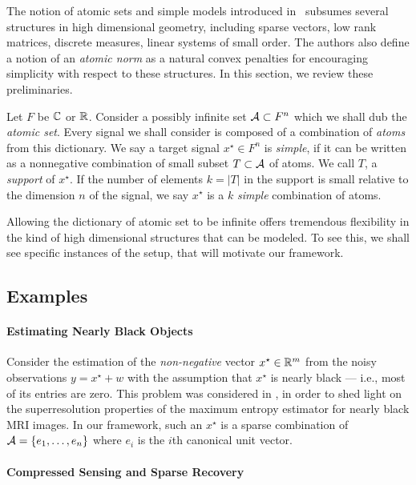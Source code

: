 The notion of atomic sets and simple models introduced in~\cite{crpw} subsumes
several structures in high dimensional geometry, including sparse
vectors, low rank matrices, discrete measures, linear systems of small order.
The authors also define a notion of an \emph{atomic norm} as a natural convex
penalties for encouraging simplicity with respect to these structures. In this
section, we review these preliminaries.

Let $F$ be $\mathbb{C}$ or $\mathbb{R}$. Consider a possibly infinite set $\mathcal{A} \subset F^n$ which
we shall dub the \emph{atomic set}. Every signal we shall consider is composed
of a combination of \emph{atoms} from this dictionary. We say a target signal
$x^\star \in F^n$ is \emph{simple}, if it can be written as a nonnegative
combination of small subset $T \subset \mathcal{A}$ of atoms. We call $T$, a
\emph{support} of $x^\star$. If the number of elements $k = |T|$ in the support
is small relative to the dimension $n$ of the signal, we say $x^\star$ is a $k$
\emph{simple} combination of atoms.

Allowing the dictionary of atomic set to be infinite offers tremendous
flexibility in the kind of high dimensional structures that can be modeled. To
see this, we shall see specific instances of the setup, that will motivate our
framework.

\subsection{Examples}

\paragraph{Estimating Nearly Black Objects}

Consider the estimation of the \emph{non-negative} vector $x^\star \in \mathbb{R}^m$
from the noisy observations $y = x^\star + w$ with the assumption that $x^\star$
is nearly black --- i.e., most of its entries are zero. This problem was
considered in \cite{DonohoNearlyBlack92,JohnstoneSparse94}, in order to shed
light on the superresolution properties of the maximum entropy estimator for
nearly black MRI images. In our framework, such an $x^\star$ is a sparse
combination of $\mathcal{A} = \{ e_1, \dots, e_n\}$ where $e_i$ is the $i$th canonical
unit vector.

\paragraph{Compressed Sensing and Sparse Recovery}

